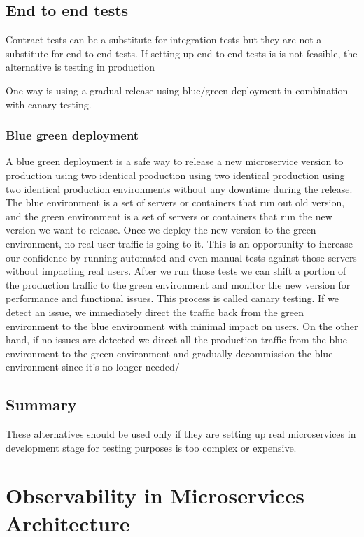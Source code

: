 \documentclass[a4paper, 11pt]{book}
\begin{document}
    \subsection{End to end tests}
    Contract tests can be a substitute for integration tests but they are not a substitute for end to end tests.
    If setting up end to end tests is is not feasible, the alternative is testing in production

    One way is using a gradual release using blue/green deployment in combination with canary testing.

    \subsubsection{Blue green deployment}
    A blue green deployment is a safe way to release a new microservice version to production using two identical production using two identical production using two identical production environments without any downtime during the release.
    The blue environment is a set of servers or containers that run out old version, and the green environment is a set of servers or containers that run the new version we want to release.
    Once we deploy the new version to the green environment, no real user traffic is going to it.
    This is an opportunity to increase our confidence by running automated and even manual tests against those servers without impacting real users.
    After we run those tests we can shift a portion of the production traffic to the green environment and monitor the new version for performance and functional issues.
    This process is called canary testing.
    If we detect an issue, we immediately direct the traffic back from the green environment to the blue environment with minimal impact on users.
    On the other hand, if no issues are detected we direct all the production traffic from the blue environment to the green environment and gradually decommission the blue environment since it's no longer needed/

    \subsection{Summary}

    These alternatives should be used only if they are setting up real microservices in development stage for testing purposes is too complex or expensive.


    \section{Observability in Microservices Architecture}
\end{document}
